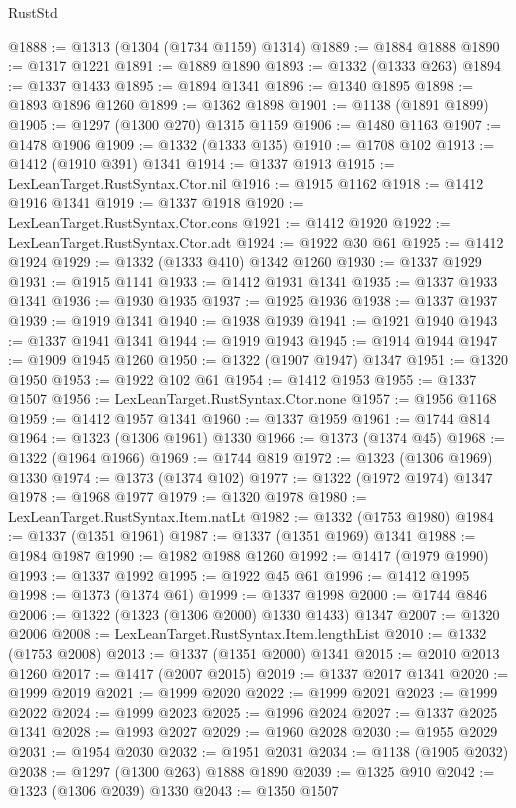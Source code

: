 \begin{lexlean}{RustStd}
\begin{coremodule}
@1888 := @1313 (@1304 (@1734 @1159) @1314)
@1889 := @1884 @1888
@1890 := @1317 @1221
@1891 := @1889 @1890
@1893 := @1332 (@1333 @263)
@1894 := @1337 @1433
@1895 := @1894 @1341
@1896 := @1340 @1895
@1898 := @1893 @1896 @1260
@1899 := @1362 @1898
@1901 := @1138 (@1891 @1899)
@1905 := @1297 (@1300 @270) @1315 @1159
@1906 := @1480 @1163
@1907 := @1478 @1906
@1909 := @1332 (@1333 @135)
@1910 := @1708 @102
@1913 := @1412 (@1910 @391) @1341
@1914 := @1337 @1913
@1915 := LexLeanTarget.RustSyntax.Ctor.nil
@1916 := @1915 @1162
@1918 := @1412 @1916 @1341
@1919 := @1337 @1918
@1920 := LexLeanTarget.RustSyntax.Ctor.cons
@1921 := @1412 @1920
@1922 := LexLeanTarget.RustSyntax.Ctor.adt
@1924 := @1922 @30 @61
@1925 := @1412 @1924
@1929 := @1332 (@1333 @410) @1342 @1260
@1930 := @1337 @1929
@1931 := @1915 @1141
@1933 := @1412 @1931 @1341
@1935 := @1337 @1933 @1341
@1936 := @1930 @1935
@1937 := @1925 @1936
@1938 := @1337 @1937
@1939 := @1919 @1341
@1940 := @1938 @1939
@1941 := @1921 @1940
@1943 := @1337 @1941 @1341
@1944 := @1919 @1943
@1945 := @1914 @1944
@1947 := @1909 @1945 @1260
@1950 := @1322 (@1907 @1947) @1347
@1951 := @1320 @1950
@1953 := @1922 @102 @61
@1954 := @1412 @1953
@1955 := @1337 @1507
@1956 := LexLeanTarget.RustSyntax.Ctor.none
@1957 := @1956 @1168
@1959 := @1412 @1957 @1341
@1960 := @1337 @1959
@1961 := @1744 @814
@1964 := @1323 (@1306 @1961) @1330
@1966 := @1373 (@1374 @45)
@1968 := @1322 (@1964 @1966)
@1969 := @1744 @819
@1972 := @1323 (@1306 @1969) @1330
@1974 := @1373 (@1374 @102)
@1977 := @1322 (@1972 @1974) @1347
@1978 := @1968 @1977
@1979 := @1320 @1978
@1980 := LexLeanTarget.RustSyntax.Item.natLt
@1982 := @1332 (@1753 @1980)
@1984 := @1337 (@1351 @1961)
@1987 := @1337 (@1351 @1969) @1341
@1988 := @1984 @1987
@1990 := @1982 @1988 @1260
@1992 := @1417 (@1979 @1990)
@1993 := @1337 @1992
@1995 := @1922 @45 @61
@1996 := @1412 @1995
@1998 := @1373 (@1374 @61)
@1999 := @1337 @1998
@2000 := @1744 @846
@2006 := @1322 (@1323 (@1306 @2000) @1330 @1433) @1347
@2007 := @1320 @2006
@2008 := LexLeanTarget.RustSyntax.Item.lengthList
@2010 := @1332 (@1753 @2008)
@2013 := @1337 (@1351 @2000) @1341
@2015 := @2010 @2013 @1260
@2017 := @1417 (@2007 @2015)
@2019 := @1337 @2017 @1341
@2020 := @1999 @2019
@2021 := @1999 @2020
@2022 := @1999 @2021
@2023 := @1999 @2022
@2024 := @1999 @2023
@2025 := @1996 @2024
@2027 := @1337 @2025 @1341
@2028 := @1993 @2027
@2029 := @1960 @2028
@2030 := @1955 @2029
@2031 := @1954 @2030
@2032 := @1951 @2031
@2034 := @1138 (@1905 @2032)
@2038 := @1297 (@1300 @263) @1888 @1890
@2039 := @1325 @910
@2042 := @1323 (@1306 @2039) @1330
@2043 := @1350 @1507

\end{coremodule}
\end{lexlean}
